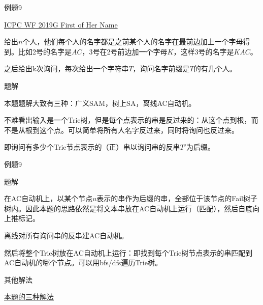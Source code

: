 \documentclass{ctexbeamer}		%
\begin{document}
\begin{frame}{例题9}

\begin{block}{\href{}{ICPC WF 2019G First of Her Name}}

给出$n$个人，他们每个人的名字都是之前某个人的名字在最前边加上一个字母得到。比如2号的名字是$AC$，3号在2号前边加一个字母$K$，这样3号的名字是$KAC$。

之后给出k次询问，每次给出一个字符串$T$，询问名字前缀是$T$的有几个人。

\end{block}

\pause

\begin{block}{题解}

本题题解大致有三种：广义SAM，树上SA，离线AC自动机。

\pause

不难看出输入是一个Trie树，但是每个点表示的串是反过来的：从这个点到根，而不是从根到这个点。可以简单将所有人名字反过来，同时将询问也反过来。

即询问有多少个Trie节点表示的（正）串以询问串的反串$T'$为后缀。

\end{block}
    
\end{frame}

\begin{frame}{例题9}

\begin{block}{题解}

在AC自动机上，以某个节点$u$表示的串作为后缀的串，全部位于该节点的Fail树子树内。因此本题的思路依然是将文本串放在AC自动机上运行（匹配），然后自底向上推标记。

\pause

离线对所有询问串的反串建AC自动机。

\pause

然后将整个Trie树放在AC自动机上运行：即找到每个Trie树节点表示的串匹配到AC自动机的哪个节点。可以用bfs/dfs遍历Trie树。

\end{block}

\pause

\begin{block}{其他解法}

\href{https://blog.csdn.net/calabash_boy/article/details/89048824}{本题的三种解法}

\end{block}

\end{frame}
\end{document}
